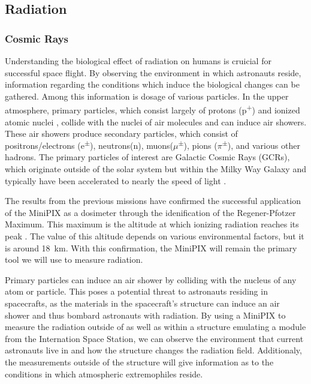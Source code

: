 \subsection{Radiation}
\label{subsec:RadiationBackground}


\subsubsection{Cosmic Rays}
Understanding the biological effect of radiation on humans is cruicial for successful space flight.
By observing the environment in which astronauts reside, information regarding the conditions which induce the biological changes can be gathered.
Among this information is dosage of various particles.
In the upper atmosphere, primary particles, which consist largely of protons (p\textsuperscript{+}) and ionized atomic nuclei \cite{Frank}, collide with the nuclei of air molecules and can induce air showers.
These air showers produce secondary particles, which consist of positrons/electrons (e\textsuperscript{$\pm$}), neutrons(n), muons($\mu$\textsuperscript{$\pm$}), pions ($\pi$\textsuperscript{$\pm$}), and various other hadrons.
The primary particles of interest are Galactic Cosmic Rays (GCRs), which originate outside of the solar system but within the Milky Way Galaxy and typically have been accelerated to nearly the speed of light \cite{GCRs}.

The results from the previous missions have confirmed the successful application of the MiniPIX as a dosimeter through the idenification of the Regener-Pfotzer Maximum. This maximum is the altitude at which ionizing radiation reaches its peak \cite{Regener}. The value of this altitude depends on various environmental factors, but it is around \SI{18}{\kilo\meter}. With this confirmation, the MiniPIX will remain the primary tool we will use to measure radiation.

Primary particles can induce an air shower by colliding with the nucleus of any atom or particle.
This poses a potential threat to astronauts residing in spacecrafts, as the materials in the spacecraft's structure can induce an air shower and thus bombard astronauts with radiation.
By using a MiniPIX to measure the radiation outside of as well as within a structure emulating a module from the Internation Space Station, we can observe the environment that current astronauts live in and how the structure changes the radiation field.
Additionaly, the measurements outside of the structure will give information as to the conditions in which atmospheric extremophiles reside.

